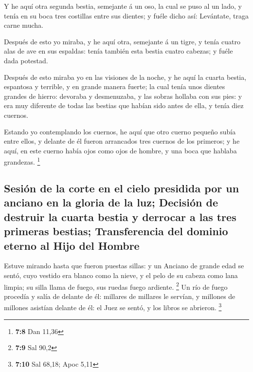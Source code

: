  Y he aquí otra segunda bestia, semejante á un oso, la
cual se puso al un lado, y tenía en su boca tres costillas entre sus
dientes; y fuéle dicho así: Levántate, traga carne mucha.

 Después de esto yo miraba, y he aquí otra, semejante á un
tigre, y tenía cuatro alas de ave en sus espaldas: tenía también esta
bestia cuatro cabezas; y fuéle dada potestad.

 Después de esto miraba yo en las visiones de la noche, y
he aquí la cuarta bestia, espantosa y terrible, y en grande manera
fuerte; la cual tenía unos dientes grandes de hierro: devoraba y
desmenuzaba, y las sobras hollaba con sus pies: y era muy diferente de
todas las bestias que habían sido antes de ella, y tenía diez cuernos.

 Estando yo contemplando los cuernos, he aquí que otro
cuerno pequeño subía entre ellos, y delante de él fueron arrancados tres
cuernos de los primeros; y he aquí, en este cuerno había ojos como ojos
de hombre, y una boca que hablaba grandezas. \footnote{\textbf{7:8} Dan
  11,36}

\hypertarget{sesiuxf3n-de-la-corte-en-el-cielo-presidida-por-un-anciano-en-la-gloria-de-la-luz-decisiuxf3n-de-destruir-la-cuarta-bestia-y-derrocar-a-las-tres-primeras-bestias-transferencia-del-dominio-eterno-al-hijo-del-hombre}{%
\subsection{Sesión de la corte en el cielo presidida por un anciano en
la gloria de la luz; Decisión de destruir la cuarta bestia y derrocar a
las tres primeras bestias; Transferencia del dominio eterno al Hijo del
Hombre}\label{sesiuxf3n-de-la-corte-en-el-cielo-presidida-por-un-anciano-en-la-gloria-de-la-luz-decisiuxf3n-de-destruir-la-cuarta-bestia-y-derrocar-a-las-tres-primeras-bestias-transferencia-del-dominio-eterno-al-hijo-del-hombre}}

 Estuve mirando hasta que fueron puestas sillas: y un
Anciano de grande edad se sentó, cuyo vestido era blanco como la nieve,
y el pelo de su cabeza como lana limpia; su silla llama de fuego, sus
ruedas fuego ardiente. \footnote{\textbf{7:9} Sal 90,2} 
Un río de fuego procedía y salía de delante de él: millares de millares
le servían, y millones de millones asistían delante de él: el Juez se
sentó, y los libros se abrieron. \footnote{\textbf{7:10} Sal 68,18; Apoc
  5,11}

